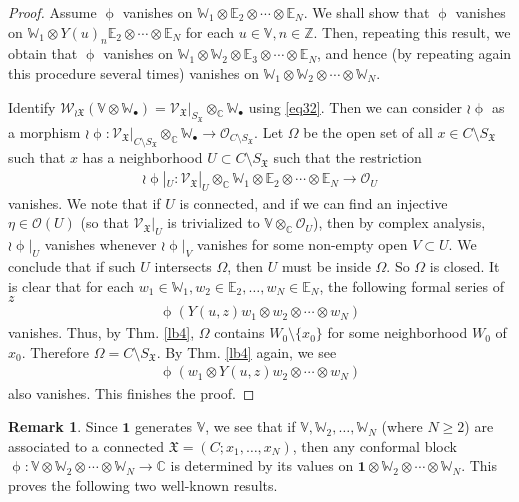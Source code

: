 \documentclass[12pt,a4paper,notitlepage]{article}
\theoremstyle{definition}
\newtheorem{rem}[df]{Remark}
\theoremstyle{plain}
\newcommand{\fk}{\mathfrak}
\newcommand{\id}{\mathbf{1}}
\newcommand{\scr}{\mathscr}
\newcommand{\SX}{{S_{\fk X}}}
\newcommand{\blt}{\bullet}
\newcommand{\Vbb}{\mathbb V}
\newcommand{\Wbb}{\mathbb W}
\newcommand{\Cbb}{\mathbb C}
\newcommand{\Zbb}{\mathbb Z}
\newcommand{\Ebb}{\mathbb E}
\numberwithin{equation}{section}
\begin{document}
\begin{proof}
Assume $\upphi$ vanishes on $\Wbb_1\otimes\Ebb_2\otimes\cdots\otimes\Ebb_N$. We shall show that $\upphi$ vanishes on $\Wbb_1\otimes Y(u)_n\Ebb_2\otimes\cdots\otimes\Ebb_N$ for each $u\in\Vbb,n\in\Zbb$. Then, repeating this result, we obtain that $\upphi$ vanishes on $\Wbb_1\otimes\Wbb_2\otimes\Ebb_3\otimes\cdots\otimes\Ebb_N$, and hence (by repeating again this procedure several times) vanishes on $\Wbb_1\otimes\Wbb_2\otimes\cdots\otimes\Wbb_N$.

Identify $\scr W_{\wr\fk X}(\Vbb\otimes\Wbb_\blt)=\scr V_{\fk X}\big|_{\SX}\otimes_\Cbb\Wbb_\blt$ using \eqref{eq32}. Then we can consider $\wr\upphi$ as a morphism $\wr\upphi:\scr V_{\fk X}\big|_{C\setminus\SX}\otimes_\Cbb\Wbb_\blt\rightarrow\scr O_{C\setminus\SX}$. Let $\Omega$ be the open set of all $x\in C\setminus\SX$ such that $x$ has a neighborhood $U\subset C\setminus\SX$ such that the restriction
\begin{align*}
\wr\upphi|_U:\scr V_{\fk X}|_U\otimes_\Cbb\Wbb_1\otimes\Ebb_2\otimes\cdots\otimes\Ebb_N\rightarrow\scr O_U	
\end{align*}
vanishes. We note that if $U$ is connected, and if we can find an injective $\eta\in\scr O(U)$ (so that $\scr V_{\fk X}|_U$ is trivialized to $\Vbb\otimes_\Cbb\scr O_U$), then by complex analysis, $\wr\upphi|_U$ vanishes whenever $\wr\upphi|_V$ vanishes for some non-empty open $V\subset U$. We conclude that if such $U$ intersects $\Omega$, then $U$ must be inside $\Omega$. So $\Omega$ is closed. It is clear that for each $w_1\in\Wbb_1,w_2\in\Ebb_2,\dots,w_N\in\Ebb_N$, the following formal series of $z$
\begin{align*}
\upphi(Y(u,z)w_1\otimes w_2\otimes\cdots\otimes w_N)	
\end{align*}
vanishes. Thus, by Thm. \ref{lb4}, $\Omega$ contains $W_0\setminus\{x_0\}$ for some neighborhood $W_0$ of $x_0$. Therefore $\Omega=C\setminus\SX$. By Thm. \ref{lb4} again, we see
\begin{align*}
\upphi(w_1\otimes Y(u,z)w_2\otimes\cdots\otimes w_N)	
\end{align*}
also vanishes. This finishes the proof.
\end{proof}

\begin{rem}\label{lb14}
Since $\id$ generates $\Vbb$, we see that if $\Vbb,\Wbb_2,\dots,\Wbb_N$ (where $N\geq 2$) are associated to a connected $\fk X=(C;x_1,\dots,x_N)$, then any conformal block $\upphi:\Vbb\otimes\Wbb_2\otimes\cdots\otimes\Wbb_N\rightarrow\Cbb$ is determined by its values on $\id\otimes\Wbb_2\otimes\cdots\otimes\Wbb_N$. This proves the following two well-known results.
\end{rem}
\end{document}
